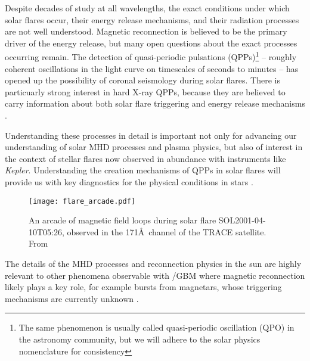 \documentclass{aastex61}
\begin{document}
Despite decades of study at all wavelengths, the exact conditions under which solar flares occur, their energy release mechanisms, and their radiation processes are not well understood.
Magnetic reconnection is believed to be the primary driver of the energy release, but many open questions about the exact processes occurring remain. 
The detection of quasi-periodic pulsations (QPPs)\footnote{\normalsize{The same phenomenon is usually called quasi-periodic oscillation (QPO) in the astronomy community, but we will adhere to the solar physics nomenclature for consistency}} -- roughly coherent oscillations in the light curve on timescales of seconds to minutes -- has opened up the possibility of coronal seismology during solar flares. 
There is particuarly strong interest in hard X-ray QPPs, because they are believed to carry information about both solar flare triggering and energy release mechanisms \citep[see e.g.][]{nakariakov2009}. 

Understanding these processes in detail is important not only for advancing our understanding of solar MHD processes and plasma physics, but also of interest in the context of stellar flares now observed in abundance with instruments like \textit{Kepler}. 
Understanding the creation mechanisms of QPPs in solar flares will provide us with key diagnostics for the physical conditions in stars \citep[e.g.][]{kowalski2010}.
\begin{figure}[tbph]
\begin{center}
\texttt{[image: flare\_arcade.pdf]}
\caption{An arcade of magnetic field loops during  solar flare SOL2001-04-10T05:26, observed in the 171\AA\ channel of the TRACE satellite. From \citep{fletcher2011}}
\label{fig:flarearcade}
\end{center}
\end{figure}
The details of the MHD processes and reconnection physics in the sun are highly relevant to other phenomena observable with \fermi/GBM where magnetic reconnection likely plays a key role, for example bursts from magnetars, whose triggering mechanisms are currently unknown  \citep{turolla2015}. 
\end{document}
